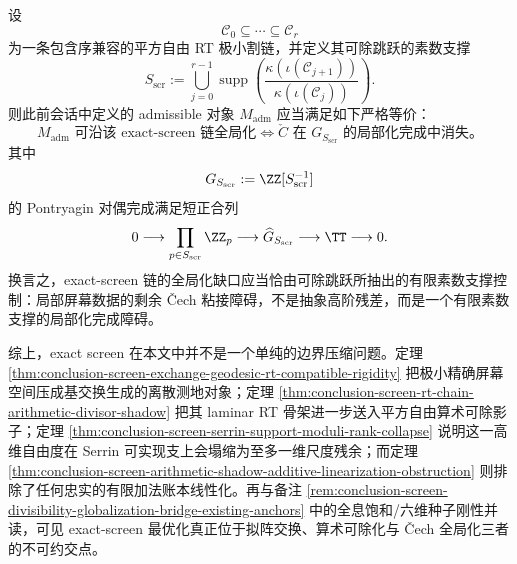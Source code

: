 \begin{conjecture}\label{conj:conclusion-exact-screen-prime-support-globalization-criterion}
设
\[
\mathcal C_0\subseteq \cdots \subseteq \mathcal C_r
\]
为一条包含序兼容的平方自由 RT 极小割链，并定义其可除跳跃的素数支撑
\[
S_{\mathrm{scr}}
:=
\bigcup_{j=0}^{r-1}
\operatorname{supp}\!\left(
\frac{\kappa(\iota(\mathcal C_{j+1}))}{\kappa(\iota(\mathcal C_j))}
\right).
\]
则此前会话中定义的 admissible 对象 \(M_{\mathrm{adm}}\) 应当满足如下严格等价：
\[
M_{\mathrm{adm}}\text{ 可沿该 exact-screen 链全局化}
\iff
\check C\text{ 在 }G_{S_{\mathrm{scr}}}\text{ 的局部化完成中消失。}
\]
其中
\[
G_{S_{\mathrm{scr}}}:=\ZZ[S_{\mathrm{scr}}^{-1}]
\]
的 Pontryagin 对偶完成满足短正合列
\[
0\longrightarrow \prod_{p\in S_{\mathrm{scr}}}\ZZ_p
\longrightarrow \widehat G_{S_{\mathrm{scr}}}
\longrightarrow \TT
\longrightarrow 0.
\]
换言之，exact-screen 链的全局化缺口应当恰由可除跳跃所抽出的有限素数支撑控制：局部屏幕数据的剩余 Čech 粘接障碍，不是抽象高阶残差，而是一个有限素数支撑的局部化完成障碍。
\end{conjecture}

\noindent
综上，exact screen 在本文中并不是一个单纯的边界压缩问题。定理 \ref{thm:conclusion-screen-exchange-geodesic-rt-compatible-rigidity} 把极小精确屏幕空间压成基交换生成的离散测地对象；定理 \ref{thm:conclusion-screen-rt-chain-arithmetic-divisor-shadow} 把其 laminar RT 骨架进一步送入平方自由算术可除影子；定理 \ref{thm:conclusion-screen-serrin-support-moduli-rank-collapse} 说明这一高维自由度在 Serrin 可实现支上会塌缩为至多一维尺度残余；而定理 \ref{thm:conclusion-screen-arithmetic-shadow-additive-linearization-obstruction} 则排除了任何忠实的有限加法账本线性化。再与备注 \ref{rem:conclusion-screen-divisibility-globalization-bridge-existing-anchors} 中的全息饱和/六维种子刚性并读，可见 exact-screen 最优化真正位于拟阵交换、算术可除化与 Čech 全局化三者的不可约交点。
